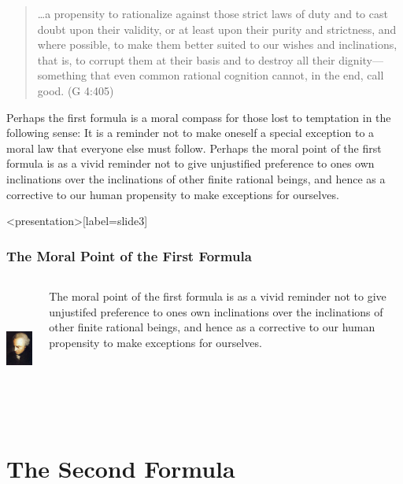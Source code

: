 \begin{quote}
	\ldots a propensity to rationalize against those strict laws of duty and to cast doubt upon their validity, or at least upon their purity and strictness, and where possible, to make them better suited to our wishes and inclinations, that is, to corrupt them at their basis and to destroy all their dignity---something that even common rational cognition cannot, in the end, call good. (G 4:405)
\end{quote}

Perhaps the first formula is a moral compass for those lost to temptation in the following sense: It is a reminder not to make oneself a special exception to a moral law that everyone else must follow. Perhaps the moral point of the first formula is as a vivid reminder not to give unjustified preference to ones own inclinations over the inclinations of other finite rational beings, and hence as a corrective to our human propensity to make exceptions for ourselves. \change

\begin{frame}<presentation>[label=slide3]
    \frametitle{The Moral Point of the First Formula}
        \begin{columns}
            \begin{column}{3cm}
                \includegraphics[height=4cm]{../../../graphics/kant.jpg}
            \end{column}
            \begin{column}{7cm}
                \alert{The moral point of the first formula is as a vivid reminder not to give unjustifed preference to ones own inclinations over the inclinations of other finite rational beings, and hence as a corrective to our human propensity to make exceptions for ourselves.} 
            \end{column}
        \end{columns}
\end{frame}


\section{The Second Formula}\label{sec:the_second_formula} %

